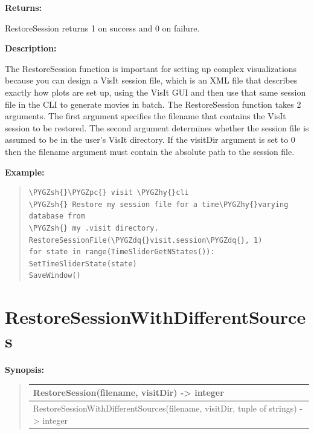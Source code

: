 \documentclass[letterpaper,10pt,english]{sphinxmanual}
\def\PYGZsh{\char`\#}
\def\PYGZpc{\char`\%}
\def\PYGZhy{\char`\-}
\def\PYGZdq{\char`\"}
\begin{document}
\begin{DUlineblock}{0em}
\item[] 
\item[] \textbf{Returns:}
\item[] RestoreSession returns 1 on success and 0 on failure.
\item[] 
\item[] \textbf{Description:}
\item[] The RestoreSession function is important for setting up complex
visualizations because you can design a VisIt session file, which is an XML
file that describes exactly how plots are set up, using the VisIt GUI and
then use that same session file in the CLI to generate movies in batch. The
RestoreSession function takes 2 arguments. The first argument specifies the
filename that contains the VisIt session to be restored. The second
argument determines whether the session file is assumed to be in the user's
VisIt directory. If the visitDir argument is set to 0 then the filename
argument must contain the absolute path to the session file.
\end{DUlineblock}

\begin{DUlineblock}{0em}
\item[] 
\end{DUlineblock}

\begin{DUlineblock}{0em}
\item[] \textbf{Example:}
\item[] 
\end{DUlineblock}
\begin{quote}

\begin{Verbatim}[commandchars=\\\{\}]
\PYGZsh{}\PYGZpc{} visit \PYGZhy{}cli
\PYGZsh{} Restore my session file for a time\PYGZhy{}varying database from
\PYGZsh{} my .visit directory.
RestoreSessionFile(\PYGZdq{}visit.session\PYGZdq{}, 1)
for state in range(TimeSliderGetNStates()):
SetTimeSliderState(state)
SaveWindow()
\end{Verbatim}
\end{quote}


\section{RestoreSessionWithDifferentSources}
\label{functions:restoresessionwithdifferentsources}
\begin{DUlineblock}{0em}
\item[] \textbf{Synopsis:}
\end{DUlineblock}
\begin{quote}

\begin{tabulary}{\linewidth}{|L|}
\hline

RestoreSession(filename, visitDir) -\textgreater{} integer
\\
\hline
RestoreSessionWithDifferentSources(filename, visitDir, tuple of strings) -\textgreater{} integer
\\
\hline\end{tabulary}

\end{quote}
\end{document}
